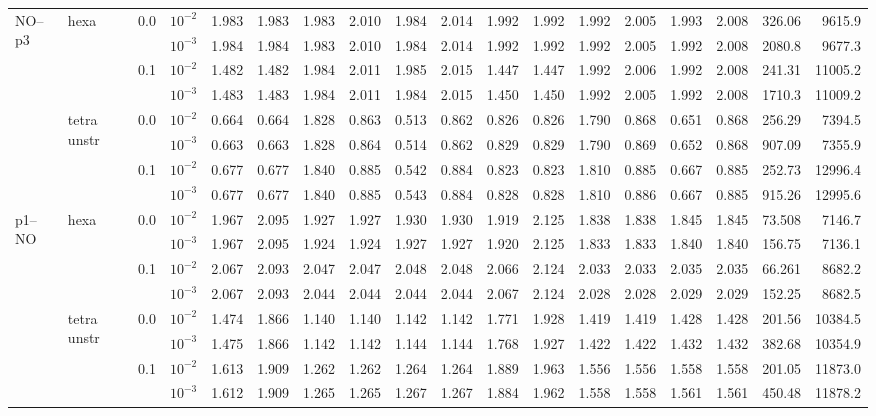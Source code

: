 \begin{longtable}{llclrrrrrrrrrrrrrr}
\multirow{8}{*}{NO--p3} & \multirow{4}{*}{hexa} & \multirow{2}{*}{0.0} & $10^{-2}$ & 1.983 & 1.983 & 1.983 & 2.010 & 1.984 & 2.014 & 1.992 & 1.992 & 1.992 & 2.005 & 1.993 & 2.008 & 326.06 & 9615.9 \\
& & & $10^{-3}$ & 1.984 & 1.984 & 1.983 & 2.010 & 1.984 & 2.014 & 1.992 & 1.992 & 1.992 & 2.005 & 1.992 & 2.008 & 2080.8 & 9677.3 \\\cline{3-18}
& & \multirow{2}{*}{0.1} & $10^{-2}$ & 1.482 & 1.482 & 1.984 & 2.011 & 1.985 & 2.015 & 1.447 & 1.447 & 1.992 & 2.006 & 1.992 & 2.008 & 241.31 & 11005.2 \\
& & & $10^{-3}$ & 1.483 & 1.483 & 1.984 & 2.011 & 1.984 & 2.015 & 1.450 & 1.450 & 1.992 & 2.005 & 1.992 & 2.008 & 1710.3 & 11009.2 \\\cline{2-18}
& \multirow{4}{*}{tetra unstr} & \multirow{2}{*}{0.0} & $10^{-2}$ & 0.664 & 0.664 & 1.828 & 0.863 & 0.513 & 0.862 & 0.826 & 0.826 & 1.790 & 0.868 & 0.651 & 0.868 & 256.29 & 7394.5 \\
& & & $10^{-3}$ & 0.663 & 0.663 & 1.828 & 0.864 & 0.514 & 0.862 & 0.829 & 0.829 & 1.790 & 0.869 & 0.652 & 0.868 & 907.09 & 7355.9 \\\cline{3-18}
& & \multirow{2}{*}{0.1} & $10^{-2}$ & 0.677 & 0.677 & 1.840 & 0.885 & 0.542 & 0.884 & 0.823 & 0.823 & 1.810 & 0.885 & 0.667 & 0.885 & 252.73 & 12996.4 \\
& & & $10^{-3}$ & 0.677 & 0.677 & 1.840 & 0.885 & 0.543 & 0.884 & 0.828 & 0.828 & 1.810 & 0.886 & 0.667 & 0.885 & 915.26 & 12995.6 \\\hline

\multirow{8}{*}{p1--NO} & \multirow{4}{*}{hexa} & \multirow{2}{*}{0.0} & $10^{-2}$ & 1.967 & 2.095 & 1.927 & 1.927 & 1.930 & 1.930 & 1.919 & 2.125 & 1.838 & 1.838 & 1.845 & 1.845 & 73.508 & 7146.7 \\
& & & $10^{-3}$ & 1.967 & 2.095 & 1.924 & 1.924 & 1.927 & 1.927 & 1.920 & 2.125 & 1.833 & 1.833 & 1.840 & 1.840 & 156.75 & 7136.1 \\\cline{3-18}
& & \multirow{2}{*}{0.1} & $10^{-2}$ & 2.067 & 2.093 & 2.047 & 2.047 & 2.048 & 2.048 & 2.066 & 2.124 & 2.033 & 2.033 & 2.035 & 2.035 & 66.261 & 8682.2 \\
& & & $10^{-3}$ & 2.067 & 2.093 & 2.044 & 2.044 & 2.044 & 2.044 & 2.067 & 2.124 & 2.028 & 2.028 & 2.029 & 2.029 & 152.25 & 8682.5 \\\cline{2-18}
& \multirow{4}{*}{tetra unstr} & \multirow{2}{*}{0.0} & $10^{-2}$ & 1.474 & 1.866 & 1.140 & 1.140 & 1.142 & 1.142 & 1.771 & 1.928 & 1.419 & 1.419 & 1.428 & 1.428 & 201.56 & 10384.5 \\
& & & $10^{-3}$ & 1.475 & 1.866 & 1.142 & 1.142 & 1.144 & 1.144 & 1.768 & 1.927 & 1.422 & 1.422 & 1.432 & 1.432 & 382.68 & 10354.9 \\\cline{3-18}
& & \multirow{2}{*}{0.1} & $10^{-2}$ & 1.613 & 1.909 & 1.262 & 1.262 & 1.264 & 1.264 & 1.889 & 1.963 & 1.556 & 1.556 & 1.558 & 1.558 & 201.05 & 11873.0 \\
& & & $10^{-3}$ & 1.612 & 1.909 & 1.265 & 1.265 & 1.267 & 1.267 & 1.884 & 1.962 & 1.558 & 1.558 & 1.561 & 1.561 & 450.48 & 11878.2 \\\hline


\end{longtable}
